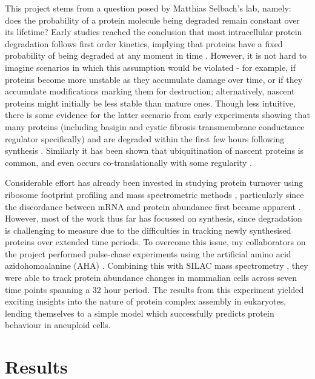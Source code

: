 \documentclass[a4paper,11pt,twoside,openright]{scrbook}
\begin{document}
This project stems from a question posed by Matthias Selbach's lab, namely: does the probability of a protein molecule being degraded remain constant over its lifetime? Early studies reached the conclusion that most intracellular protein degradation follows first order kinetics, implying that proteins have a fixed probability of being degraded at any moment in time \cite{Schimke1970,Goldberg1974}. However, it is not hard to imagine scenarios in which this assumption would be violated - for example, if proteins become more unstable as they accumulate damage over time, or if they accumulate modifications marking them for destruction; alternatively, nascent proteins might initially be less stable than mature ones. Though less intuitive, there is some evidence for the latter scenario from early experiments showing that many proteins (including basigin and cystic fibrosis transmembrane conductance regulator specifically) and are degraded within the first few hours following synthesis \cite{Wheatley1980,Tyler2012,Ward1994}. Similarly it has been shown that ubiquitination of nascent proteins is common, and even occurs co-translationally with some regularity \cite{Kim2011,Wang2013}.

Considerable effort has already been invested in studying protein turnover using ribosome footprint profiling and mass spectrometric methods  \cite{Ingolia2009,Ingolia2011,Doherty2009,Schwanhausser2011,Kristensen2013}, particularly since the discordance between mRNA and protein abundance first became apparent \cite{Gygi1999a,Chen2002}. However, most of the work thus far has focussed on synthesis, since degradation is challenging to measure due to the difficulties in tracking newly synthesised proteins over extended time periods. To overcome this issue, my collaborators on the project performed pulse-chase experiments using the artificial amino acid azidohomoalanine (AHA) \cite{Kiick2002,Dieterich2006}. Combining this with SILAC mass spectrometry \cite{Ong2002a}, they were able to track protein abundance changes in mammalian cells across seven time points spanning a 32 hour period. The results from this experiment yielded exciting insights into the nature of protein complex assembly in eukaryotes, lending themselves to a simple model which successfully predicts protein behaviour in aneuploid cells.

\section{Results}
\end{document}
